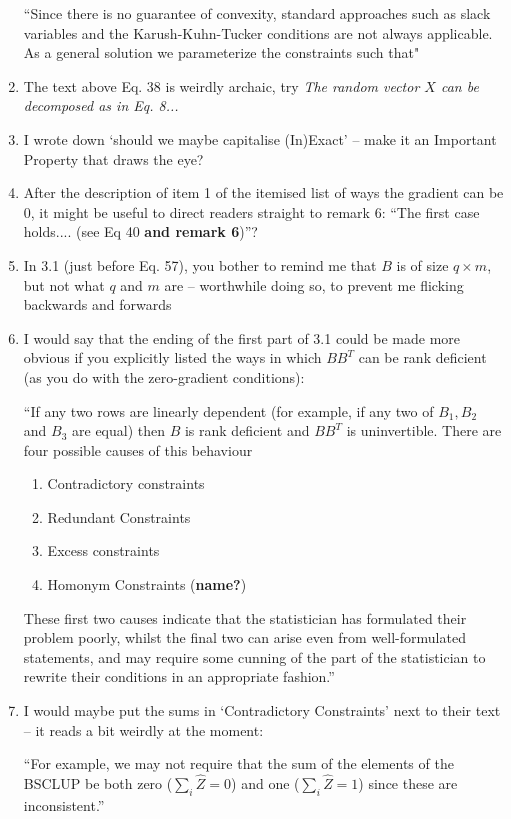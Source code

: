 \documentclass[]{article}
\begin{document}
\begin{enumerate}
		``Since there is no guarantee of convexity, standard approaches such as slack variables and the Karush-Kuhn-Tucker conditions are not always applicable. As a general solution we parameterize the constraints such that"

		\item The text above Eq. 38 is weirdly archaic, try \textit{The random vector $X$ can be decomposed as in Eq. 8...}
		\item I wrote down `should we maybe capitalise (In)Exact' -- make it an Important Property that draws the eye?
		\item After the description of item 1 of the itemised list of ways the gradient can be 0, it might be useful to direct readers straight to remark 6:
		``The first case holds.... (see Eq 40 \textbf{and remark 6})''?
		\item In 3.1 (just before Eq. 57), you bother to remind me that $B$ is of size $q\times m$, but not what $q$ and $m$ are -- worthwhile doing so, to prevent me flicking backwards and forwards
		\item I would say that the ending of the first part of 3.1 could be made more obvious if you explicitly listed the ways in which $BB^T$ can be rank deficient (as you do with the zero-gradient conditions):
		
		``If any two rows are linearly dependent (for example, if any two of $B_1, B_2$ and $B_3$ are equal) then $B$ is rank deficient and $BB^T$ is uninvertible. There are four possible causes of this behaviour
		\begin{enumerate}
			\item Contradictory constraints
			\item Redundant Constraints
			\item Excess constraints
			\item Homonym Constraints (\textbf{name?})
		\end{enumerate}
		These first two causes indicate that the statistician has formulated their problem poorly, whilst the final two can arise even from well-formulated statements, and may require some cunning of the part of the statistician to rewrite their conditions in an appropriate fashion.''

		\item I would maybe put the sums in `Contradictory Constraints' next to their text -- it reads a bit weirdly at the moment:
		
		``For example, we may not require that the sum of the elements of the BSCLUP be both zero ($\sum_i \hat{Z} = 0$) and one ($\sum_i \hat{Z} = 1$) since these are inconsistent.''


\end{enumerate}
\end{document}
